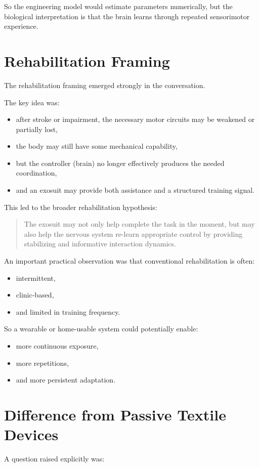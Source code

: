 \documentclass[11pt]{article}
\begin{document}
So the engineering model would estimate parameters numerically, but the biological interpretation is that the brain learns through repeated sensorimotor experience.

\section{Rehabilitation Framing}
The rehabilitation framing emerged strongly in the conversation.

The key idea was:
\begin{itemize}[leftmargin=1.5em]
    \item after stroke or impairment, the necessary motor circuits may be weakened or partially lost,
    \item the body may still have some mechanical capability,
    \item but the controller (brain) no longer effectively produces the needed coordination,
    \item and an exosuit may provide both assistance and a structured training signal.
\end{itemize}

This led to the broader rehabilitation hypothesis:
\begin{quote}
The exosuit may not only help complete the task in the moment, but may also help the nervous system re-learn appropriate control by providing stabilizing and informative interaction dynamics.
\end{quote}

An important practical observation was that conventional rehabilitation is often:
\begin{itemize}[leftmargin=1.5em]
    \item intermittent,
    \item clinic-based,
    \item and limited in training frequency.
\end{itemize}

So a wearable or home-usable system could potentially enable:
\begin{itemize}[leftmargin=1.5em]
    \item more continuous exposure,
    \item more repetitions,
    \item and more persistent adaptation.
\end{itemize}

\section{Difference from Passive Textile Devices}
A question raised explicitly was:
\end{document}
